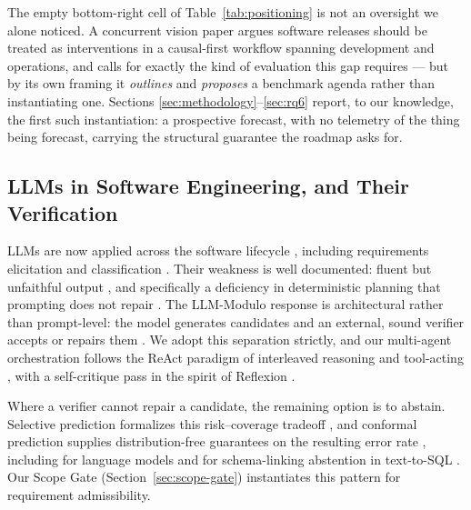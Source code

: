 \documentclass[journal, 10pt]{IEEEtran}
\begin{document}
The empty bottom-right cell of Table~\ref{tab:positioning} is not an oversight we
alone noticed. A concurrent vision paper \cite{pietrantuono2026causalse} argues
software releases should be treated as interventions in a causal-first workflow
spanning development and operations, and calls for exactly the kind of
evaluation this gap requires --- but by its own framing it \emph{outlines} and
\emph{proposes} a benchmark agenda rather than instantiating one. Sections
\ref{sec:methodology}--\ref{sec:rq6} report, to our knowledge, the first such
instantiation: a prospective forecast, with no telemetry of the thing being
forecast, carrying the structural guarantee the roadmap asks for.

\subsection{LLMs in Software Engineering, and Their Verification}
LLMs are now applied across the software lifecycle \cite{hou2024llm4se}, including requirements elicitation and classification \cite{arora2024rellm}. Their weakness is well documented: fluent but unfaithful output \cite{ji2023hallucination}, and specifically a deficiency in deterministic planning that prompting does not repair \cite{kambhampati2024,valmeekam2023planbench}. The LLM-Modulo response is architectural rather than prompt-level: the model generates candidates and an external, sound verifier accepts or repairs them \cite{kambhampati2024,garcez2023neurosymbolic}. We adopt this separation strictly, and our multi-agent orchestration follows the ReAct paradigm of interleaved reasoning and tool-acting \cite{yao2023react,wu2023autogen}, with a self-critique pass in the spirit of Reflexion \cite{shinn2023reflexion}.

Where a verifier cannot repair a candidate, the remaining option is to abstain. Selective prediction formalizes this risk--coverage tradeoff \cite{elyaniv2010selective,geifman2017selective}, and conformal prediction supplies distribution-free guarantees on the resulting error rate \cite{vovk2005algorithmic,angelopoulos2023conformal}, including for language models \cite{quach2024conformal} and for schema-linking abstention in text-to-SQL \cite{chen2025rts}. Our Scope Gate (Section~\ref{sec:scope-gate}) instantiates this pattern for requirement admissibility.
\end{document}
